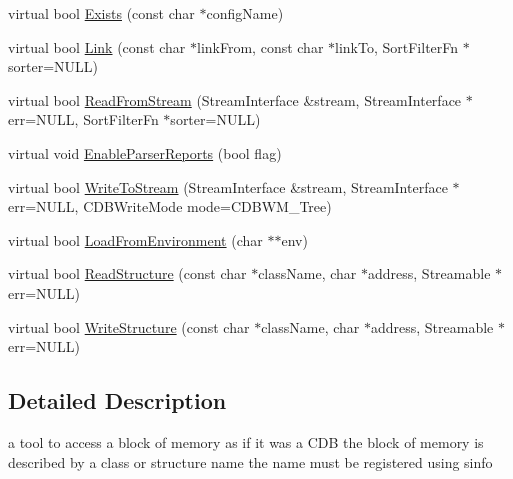 \begin{DoxyCompactItemize}
\item 
virtual bool \hyperlink{classMMCDB_a205dc3d52790ccfb1b16d0ba673a0b3d}{Exists} (const char $\ast$configName)
\item 
virtual bool \hyperlink{classMMCDB_ab7e356a3c7aae42604aafc9af5a3a768}{Link} (const char $\ast$linkFrom, const char $\ast$linkTo, SortFilterFn $\ast$sorter=NULL)
\item 
virtual bool \hyperlink{classMMCDB_a8aa9bcc81864cc469b5afb9c36900b65}{ReadFromStream} (StreamInterface \&stream, StreamInterface $\ast$err=NULL, SortFilterFn $\ast$sorter=NULL)
\item 
virtual void \hyperlink{classMMCDB_a50be40a7843f2f37c8557b0b7d76ec63}{EnableParserReports} (bool flag)
\item 
virtual bool \hyperlink{classMMCDB_a99ba37f9be65826f933b69f2d88f5666}{WriteToStream} (StreamInterface \&stream, StreamInterface $\ast$err=NULL, CDBWriteMode mode=CDBWM\_\-Tree)
\item 
virtual bool \hyperlink{classMMCDB_afb71b98da114ae85f4801ebc2c0342cc}{LoadFromEnvironment} (char $\ast$$\ast$env)
\item 
virtual bool \hyperlink{classMMCDB_ab24a4a208545fed2091bb4d366d865f9}{ReadStructure} (const char $\ast$className, char $\ast$address, Streamable $\ast$err=NULL)
\item 
virtual bool \hyperlink{classMMCDB_a0ad3622e884d11d5a672c6b91ef6538c}{WriteStructure} (const char $\ast$className, char $\ast$address, Streamable $\ast$err=NULL)
\end{DoxyCompactItemize}


\subsection{Detailed Description}
a tool to access a block of memory as if it was a CDB the block of memory is described by a class or structure name the name must be registered using sinfo 

